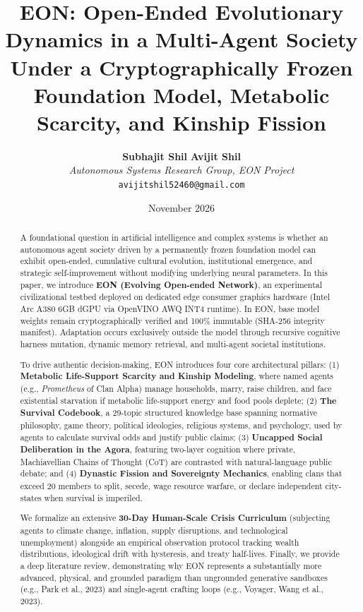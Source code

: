 \documentclass[11pt,a4paper]{article}
\title{\textbf{EON: Open-Ended Evolutionary Dynamics in a Multi-Agent Society Under a Cryptographically Frozen Foundation Model, Metabolic Scarcity, and Kinship Fission}}
\author{
    \textbf{Subhajit Shil} \quad \textbf{Avijit Shil} \\
    \textit{Autonomous Systems Research Group, EON Project} \\
    \texttt{avijitshil52460@gmail.com}
}
\date{November 2026}
\begin{document}
\maketitle

\begin{abstract}
A foundational question in artificial intelligence and complex systems is whether an autonomous agent society driven by a permanently frozen foundation model can exhibit open-ended, cumulative cultural evolution, institutional emergence, and strategic self-improvement without modifying underlying neural parameters. In this paper, we introduce \textbf{EON (Evolving Open-ended Network)}, an experimental civilizational testbed deployed on dedicated edge consumer graphics hardware (Intel Arc A380 6GB dGPU via OpenVINO AWQ INT4 runtime). In EON, base model weights remain cryptographically verified and 100\% immutable (SHA-256 integrity manifest). Adaptation occurs exclusively outside the model through recursive cognitive harness mutation, dynamic memory retrieval, and multi-agent societal institutions.

To drive authentic decision-making, EON introduces four core architectural pillars: 
(1) \textbf{Metabolic Life-Support Scarcity and Kinship Modeling}, where named agents (e.g., \textit{Prometheus} of Clan Alpha) manage households, marry, raise children, and face existential starvation if metabolic life-support energy and food pools deplete; 
(2) \textbf{The Survival Codebook}, a 29-topic structured knowledge base spanning normative philosophy, game theory, political ideologies, religious systems, and psychology, used by agents to calculate survival odds and justify public claims; 
(3) \textbf{Uncapped Social Deliberation in the Agora}, featuring two-layer cognition where private, Machiavellian Chains of Thought (CoT) are contrasted with natural-language public debate; and 
(4) \textbf{Dynastic Fission and Sovereignty Mechanics}, enabling clans that exceed 20 members to split, secede, wage resource warfare, or declare independent city-states when survival is imperiled.

We formalize an extensive \textbf{30-Day Human-Scale Crisis Curriculum} (subjecting agents to climate change, inflation, supply disruptions, and technological unemployment) alongside an empirical observation protocol tracking wealth distributions, ideological drift with hysteresis, and treaty half-lives. Finally, we provide a deep literature review, demonstrating why EON represents a substantially more advanced, physical, and grounded paradigm than ungrounded generative sandboxes (e.g., Park et al., 2023) and single-agent crafting loops (e.g., Voyager, Wang et al., 2023).
\end{abstract}
\end{document}
